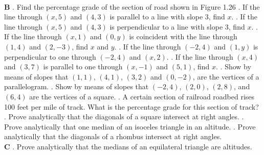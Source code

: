 \documentclass[10pt,letterpaper]{article}
\begin{document}
\\
\newline \textbf{B}
. Find the percentage grade of the section of road shown in Figure 1.26
. If the line through $(x,5)$ and $(4,3)$ is parallel to a line with slope 3, find $x$.
. If the line through $(x,5)$ and $(4,3)$ is perpendicular to a line with slope 3, find $x$.
. If the line through $(x,1)$ and $(0,y)$ is coincident with the line through $(1,4)$ and $(2,-3)$, find $x$ and $y$.
. If the line through $(-2,4)$ and $(1,y)$ is perpendicular to one through $(-2,4)$ and $(x,2)$.
. If the line through $(x,4)$ and $(3,7)$ is parallel to one through $(x,-1)$ and $(5,1)$, find $x$.
. Show by means of slopes that $(1,1)$, $(4,1)$, $(3,2)$ and $(0,-2)$, are the vertices of a parallelogram.
. Show by means of slopes that $(-2,4)$, $(2,0)$, $(2,8)$, and $(6,4)$ are the vertices of a square.
. A certain section of railroad roadbed rises 100 feet per mile of track. What is the percentage grade for this section of track?
. Prove analytically that the diagonals of a square intersect at right angles.
. Prove analytically that one median of an isoceles triangle in an altitude.
. Prove analytically that the diagonals of a rhombus intersect at right angles.
\\
\newline \textbf{C}
. Prove analytically that the medians of an equilateral triangle are altitudes.
\end{document}
